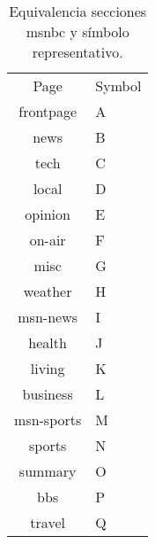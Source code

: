 \begin{table}[]
	\centering
	\label{table-list-symbol}
	\begin{tabular}{cl}
		Page       & Symbol \\ \cline{1-2}
		frontpage  & A      \\
		news       & B      \\
		tech       & C      \\
		local      & D      \\
		opinion    & E      \\
		on-air     & F      \\
		misc       & G      \\
		weather    & H      \\
		msn-news   & I      \\
		health     & J      \\
		living     & K      \\
		business   & L      \\
		msn-sports & M      \\
		sports     & N      \\
		summary    & O      \\
		bbs        & P      \\
		travel     & Q      \\ 
	\end{tabular}
	\caption{Equivalencia secciones msnbc y símbolo representativo.}
\end{table}